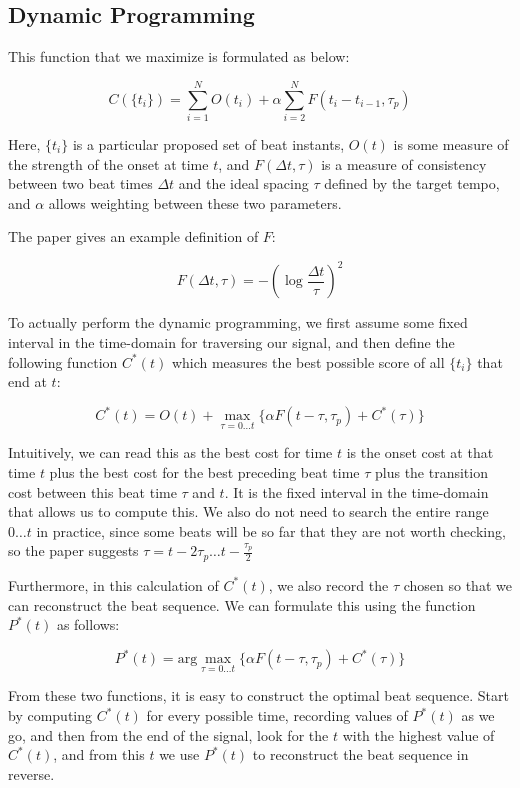 \documentclass[12pt]{article}
\begin{document}
\subsection{Dynamic Programming}

This function that we maximize is formulated as below:

\[
    C(\{t_i\}) = \sum_{i=1}^N O(t_i) + \alpha \sum_{i=2}^N F(t_i - t_{i-1}, \tau_p)
\] 


Here, $\{t_i\}$ is a particular proposed set of beat instants, $O(t)$ is some measure of the strength of the onset at time $t$, and $F(\Delta t, \tau)$ is a measure of consistency between two beat times $\Delta t$ and the ideal spacing $\tau$ defined by the target tempo, and $\alpha$ allows weighting between these two parameters.

The paper gives an example definition of $F$:

\[
    F(\Delta t, \tau) =-\left(\log \frac{\Delta t}{\tau}\right)^2
\] 

To actually perform the dynamic programming, we first assume some fixed interval in the time-domain for traversing our signal, and then define the following function $C^*(t)$ which measures the best possible score of all $\{t_i\}$ that end at $t$:

\[
    C^*(t) = O(t) + \max_{\tau=0\ldots t}\{\alpha F(t - \tau, \tau_p) + C^*(\tau)\}
\] 

Intuitively, we can read this as the best cost for time $t$ is the onset cost at that time $t$ plus the best cost for the best preceding beat time $\tau$ plus the transition cost between this beat time $\tau$ and $t$. It is the fixed interval in the time-domain that allows us to compute this. We also do not need to search the entire range $0\ldots t$ in practice, since some beats will be so far that they are not worth checking, so the paper suggests $\tau = t - 2\tau_p \ldots t - \frac{\tau_p}{2}$


Furthermore, in this calculation of $C^*(t)$, we also record the $\tau$ chosen so that we can reconstruct the beat sequence. We can formulate this using the function $P^*(t)$ as follows:

\[
    P^*(t) = \mathrm{arg }\max_{\tau=0\ldots t}\{\alpha F(t - \tau, \tau_p) + C^*(\tau)\}
\] 

From these two functions, it is easy to construct the optimal beat sequence. Start by computing $C^*(t)$ for every possible time, recording values of $P^*(t)$ as we go, and then from the end of the signal, look for the $t$ with the highest value of $C^*(t)$, and from this $t$ we use $P^*(t)$ to reconstruct the beat sequence in reverse.
\end{document}
